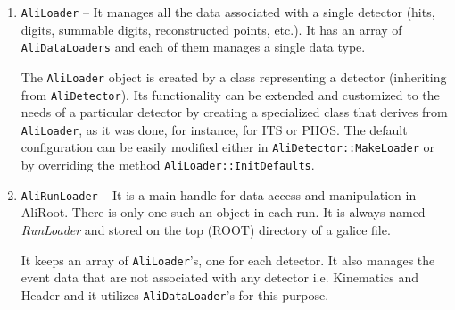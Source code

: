 \documentclass[12pt,a4paper,twoside]{article}
\begin{document}
{\begin{enumerate}
  A single file contains the data corresponding to a single processing 
  phase and solely of one detector.
  By default the file is named according to the schema
  {\it Detector Name + Data Name + .root} but it can be 
  changed in run-time if needed so the data can be stored in or retrieved
  from an alternative source. When needed, 
  the user can limit the number of events stored in a single file.
  If the maximum number is exceeded, a file is closed
  and a new one is opened with the consecutive number added
  to  its name before {\it .root} suffix. Of course, 
  during the reading process, files are also automatically 
  interchanged behind the scenes and it is invisible to the user.

  The \texttt{AliDataLoader} class performs all the tasks related 
  to  file management e.g. opening, closing, 
  ROOT directories management, etc. 
  Hence, for each data type the average file size can be 
  tuned. It is important because it is undesirable to store small 
  files on the mass storage systems and on the other hand, all file 
  systems have a maximum file size allowed.
  

\item \texttt{AliLoader}  --    It manages all the data associated with a 
  single detector (hits, digits, summable digits, reconstructed points, etc.). 
  It has an array of \texttt{AliDataLoaders} and each of them manages 
  a single data type. 
  
  The \texttt{AliLoader} object is created by a class representing 
  a detector (inheriting from \texttt{AliDetector}). 
  Its functionality can be extended and customized to the needs of a 
  particular detector by creating a specialized class that derives
  from \texttt{AliLoader}, as it was done, for instance, for ITS or PHOS. 
  The default configuration can be 
  easily modified either in \texttt{AliDetector::MakeLoader} 
  or by overriding the method \texttt{AliLoader::InitDefaults}.
  
  
\item \texttt{AliRunLoader} --  It is a main handle for data access and manipulation in
  AliRoot. There is only one such an object in each run.
  It is always named {\it RunLoader} and stored
  on the top (ROOT) directory of a galice file.
  
  It keeps an array of \texttt{AliLoader}'s, one for each detector.
  It also manages the event data that are not associated with any detector
  i.e. Kinematics and Header and it utilizes \texttt{AliDataLoader}'s
  for this purpose. 
  

\end{enumerate}}
\end{document}
